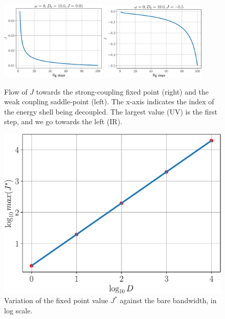 \begin{figure}[!htpb]
	\centering
	\includegraphics[width=0.45\textwidth]{../figures/relJ.pdf}
	\includegraphics[width=0.45\textwidth]{../figures/rel2J.pdf}
	\caption{Flow of \(J\) towards the strong-coupling fixed point (right) and the weak coupling saddle-point (left).  The x-axis indicates the index of the energy shell being decoupled. The largest value (UV) is the first step, and we go towards the left (IR).}
\end{figure}

\begin{figure}[!htpb]
	\centering
	\includegraphics[scale=0.4]{../figures/JvsD_kondo.pdf}
	\caption{Variation of the fixed point value \(J^*\) against the bare bandwidth, in log scale.}
	\label{JvsD-kondo}
\end{figure}


